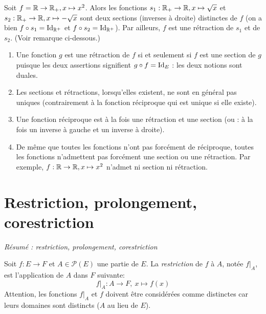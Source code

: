 \begin{exemple}
Soit $f = \mathbb{R}\to \mathbb{R}_+, x\mapsto x^2$. Alors les fonctions $s_1 : \mathbb{R}_+\to \mathbb{R}, x\mapsto \sqrt x$ et $s_2 : \mathbb{R}_+\to \mathbb{R}, x\mapsto -\sqrt x$ sont deux sections (inverses à droite) distinctes de $f$ (on a bien $f\circ s_1 = \operatorname{Id}_{\mathbb{R}^+}$ et $f\circ s_2 = \operatorname{Id}_{\mathbb{R}^+}$). 
Par ailleurs, $f$ est une rétraction de $s_1$ et de $s_2$. (Voir remarque ci-dessous.)

\end{exemple}

\begin{remarque}
\begin{enumerate}
\item Une fonction $g$ est une rétraction de $f$ si et seulement si $f$ est une section de $g$ puisque les deux assertions signifient $g\circ f = \operatorname{Id}_E$ : les deux notions sont \og duales\fg.
\item Les sections et rétractions, lorsqu'elles existent, ne sont en général pas uniques (contrairement à la fonction réciproque qui est unique si elle existe).
\item Une fonction réciproque est à la fois une rétraction et une section (ou : à la fois un inverse à gauche et un inverse à droite).
\item De même que toutes les fonctions n'ont pas forcément de réciproque, toutes les fonctions n'admettent pas forcément une section ou une rétraction. Par exemple, $f : \mathbb{R}\to \mathbb{R}, x\mapsto x^2$ n'admet ni section ni rétraction. 
\end{enumerate}
\end{remarque}




\section{Restriction, prolongement, corestriction}

\emph{Résumé : restriction, prolongement, corestriction}

\begin{definition}[Restriction]
Soit $f : E\to F$ et $A \in \mathcal P(E)$ une partie de $E$. La \emph{restriction} de $f$ à $A$, notée $f|_{A}$, est l'application de $A$ dans $F$ suivante:
\[
f|_{A} : A\to F, \: x\mapsto f(x)
\]
Attention, les fonctions $f|_A$ et $f$ doivent être considérées comme distinctes car leurs domaines sont distincts ($A$ au lieu de $E$).
\end{definition}


